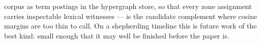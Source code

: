 corpus as term postings in the hypergraph store, so that every zone assignment carries inspectable lexical witnesses --- is the candidate complement where cosine margins are too thin to call.  On a shepherding timeline this is future work of the best kind: small enough that it may well be finished before the paper is.



